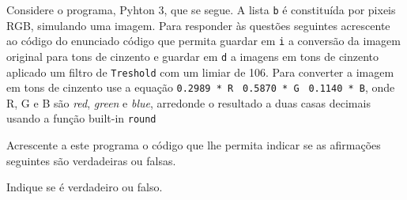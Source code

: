 \documentclass[12pt,varwidth=16cm,border=1pt]{standalone}
\begin{document}
Considere o programa, Pyhton 3, que se segue. A lista \verb+b+ é constituída por pixeis RGB, simulando uma imagem. Para responder às questões seguintes acrescente ao código do enunciado código que permita guardar em \verb+i+ a conversão da imagem original para tons de cinzento e guardar em \verb+d+ a imagens em tons de cinzento aplicado um filtro de \verb+Treshold+ com um limiar de 106. Para converter a imagem em tons de cinzento use a equação \verb+0.2989 * R + \verb+0.5870 * G + \verb+0.1140 * B+, onde R, G e B são \textit{red}, \textit{green} e \textit{blue}, arredonde o resultado a duas casas decimais usando a função built-in \verb+round+



Acrescente a este programa o código que lhe permita indicar se as
afirmações seguintes são verdadeiras ou falsas.

Indique se é verdadeiro ou falso.
\end{document}
